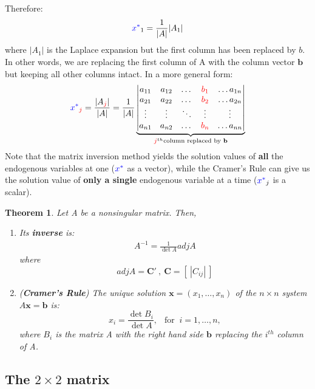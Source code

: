 \documentclass[10pt,a4paper]{book}
\newcommand{\red}[1]{\textcolor{red}{#1}}
\newcommand{\blue}[1]{\textcolor{blue}{#1}}
\newtheorem{theorem}{Theorem}[section]
\theoremstyle{definition}\newtheorem{definition}{Definition}
\theoremstyle{definition}\newtheorem{fact}{Fact}
\theoremstyle{definition}\newtheorem{ex}{Ex.}
\theoremstyle{definition}\newtheorem{project}{Project}
\theoremstyle{definition}\newtheorem{problem}{Problem}
\theoremstyle{definition}\newtheorem{example}{Example}
\numberwithin{theorem}{chapter}
\numberwithin{corollary}{chapter}
\numberwithin{assumption}{chapter}
\numberwithin{definition}{chapter}
\numberwithin{prop}{chapter}
\numberwithin{notation}{chapter}
\numberwithin{problem}{chapter}
\numberwithin{example}{chapter}
\numberwithin{fact}{chapter}
\numberwithin{ex}{chapter}
\newenvironment{ftheorem}
{\begin{mdframed}\begin{theorem}}
		{\end{theorem}\end{mdframed}}
\def\C{\mathbf C}
\def\b{\mathbf b}
\def\x{\mathbf x}
\begin{document}
	Therefore:
	\begin{equation*}
		\blue{x^*}_1 = \frac{1}{|A|}|A_1|
	\end{equation*}
	where $|A_1|$ is the Laplace expansion but the first column has been replaced by $b$. In other words, we are replacing the first column of A with the column vector $\b$ but keeping all other columns intact. In a more general form:
	\begin{equation*}
		\blue{x^*}_{\red{j}} = \frac{|A_{\red{j}}|}{|A|} = \frac{1}{|A|}
		\underbrace{\begin{vmatrix}
				a_{11} & a_{12} & \dots & \red{b_1} & \dots a_{1n} \\
				a_{21} & a_{22} & \dots & \red{b_2} & \dots a_{2n} \\
				\vdots & \vdots & \ddots & \vdots & \vdots \\
				a_{n1} & a_{n2} & \dots & \red{b_n} & \dots a_{nn}  
		\end{vmatrix}}_{\red{j}^{th} \text{column replaced by $\b$}}
	\end{equation*}
	Note that the matrix inversion method yields the solution values of \textbf{all} the endogenous variables at one ($\blue{x^*}$ as a vector), while the Cramer's Rule can give us the solution value of \textbf{only a single} endogenous variable at a time ($\blue{x^*}_j$ is a scalar).
	
	\begin{ftheorem}
		Let A be a nonsingular matrix. Then,
		\begin{enumerate}[label=\alph*)]
			\item Its \textbf{inverse} is:
			\begin{align*}
				A^{-1} = \frac{1}{\det A} adj A 
			\end{align*}
			where
			\begin{equation*}
				adj A = \C' \ , \ \C = [ \ |C_{ij}| \ ]
			\end{equation*}
			\item (\textbf{Cramer's Rule}) The unique solution $\x = (x_1, \dots, x_n)$ of the $n\times n$ system $A\x=\b$ is:
			\begin{equation*}
				x_i = \frac{\det B_i}{\det A}, \ \ \text{ for }\ i = 1, \dots, n,
			\end{equation*}
			where $B_i$ is the matrix A with the right hand side $\b$ replacing the $i^{th}$ column of A.
		\end{enumerate}
	\end{ftheorem}
	
	\subsection{The $2\times 2$ matrix}
\end{document}

